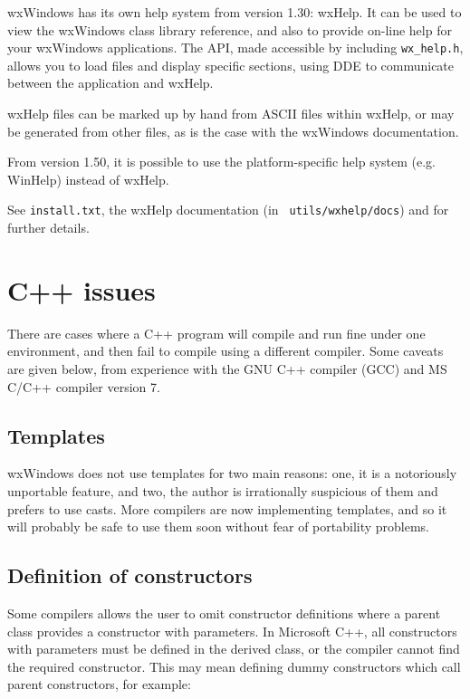 wxWindows has its own help system from version 1.30: wxHelp. It can be
used to view the wxWindows class library reference, and also to provide
on-line help for your wxWindows applications. The API, made accessible
by including {\tt wx\_help.h}, allows you to load files and display
specific sections, using DDE to communicate between the application and
wxHelp.

wxHelp files can be marked up by hand from ASCII files within wxHelp,
or may be generated from other files, as is the case with the wxWindows
documentation.

From version 1.50, it is possible to use the platform-specific help
system (e.g. WinHelp) instead of wxHelp.

See {\tt install.txt}, the wxHelp documentation (in {\tt
utils/wxhelp/docs}) and  for further details.

\section{C++ issues}

There are cases where a C++ program will compile and run fine under one
environment, and then fail to compile using a different compiler. Some
caveats are given below, from experience with the GNU C++ compiler (GCC)
and MS C/C++ compiler version 7.

\subsection{Templates}

wxWindows does not use templates for two main reasons: one, it is a
notoriously unportable feature, and two, the author is irrationally
suspicious of them and prefers to use casts. More compilers are
now implementing templates, and so it will probably be safe to use
them soon without fear of portability problems.

\subsection{Definition of constructors}

Some compilers allows the user to omit constructor definitions where a
parent class provides a constructor with parameters. In Microsoft C++,
all constructors with parameters must be defined in the derived class,
or the compiler cannot find the required constructor.  This may mean
defining dummy constructors which call parent constructors, for example:

